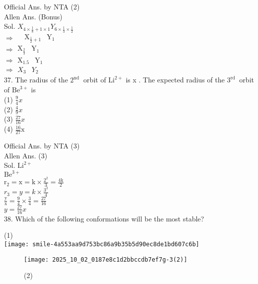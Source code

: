 \documentclass[10pt]{article}
\begin{document}
Official Ans. by NTA (2)\\
Allen Ans. (Bonus)\\
Sol. \(X_{4 \times \frac{1}{8}+1 \times 1} Y_{6 \times \frac{1}{3} \times \frac{1}{2}}\)\\
\(\Rightarrow \quad \begin{array}{cc}\mathrm{X}_{\frac{1}{2}+1} & \mathrm{Y}_{1}\end{array}\)\\
\(\Rightarrow \begin{array}{cc}\mathrm{X}_{\frac{2}{3}} & \mathrm{Y}_{1}\end{array}\)\\
\(\Rightarrow \begin{array}{ll}\mathrm{X}_{1.5} & \mathrm{Y}_{1}\end{array}\)\\
\(\Rightarrow \begin{array}{ll}X_{3} & Y_{2}\end{array}\)\\
37. The radius of the \(2^{\text {nd }}\) orbit of \(\mathrm{Li}^{2+}\) is x . The expected radius of the \(3^{\text {rd }}\) orbit of \(\mathrm{Be}^{3+}\) is\\
(1) \(\frac{9}{4} x\)\\
(2) \(\frac{4}{9} x\)\\
(3) \(\frac{27}{16} x\)\\
(4) \(\frac{16}{27} \mathrm{x}\)

Official Ans. by NTA (3)\\
Allen Ans. (3)\\
Sol. \(\mathrm{Li}^{2+}\)\\
\(\mathrm{Be}^{3+}\)\\
\(\mathrm{r}_{2}=\mathrm{x}=\mathrm{k} \times \frac{2^{2}}{3}=\frac{4 \mathrm{k}}{2}\)\\
\(r_{3}=y=k \times \frac{3^{2}}{4}\)\\
\(\frac{\mathrm{y}}{\mathrm{x}}=\frac{9}{4} \times \frac{3}{4}=\frac{27}{16}\)\\
\(y=\frac{27}{16} x\)\\
38. Which of the following conformations will be the most stable?

(1)\\
\texttt{[image: smile-4a553aa9d753bc86a9b35b5d90ec8de1bd607c6b]}

\begin{figure}[h]
\begin{center}
\captionsetup{labelformat=empty}
\caption{(2)}
  \texttt{[image: 2025\_10\_02\_0187e8c1d2bbccdb7ef7g-3(2)]}
\end{center}
\end{figure}
\end{document}
